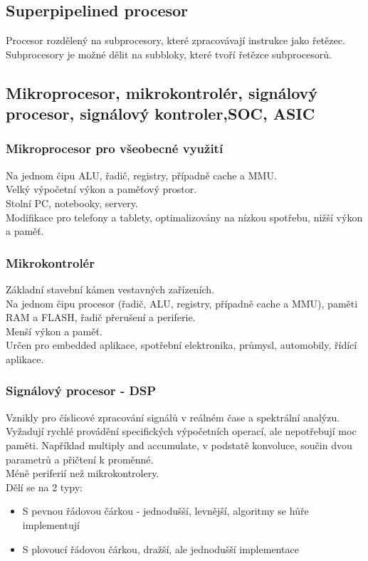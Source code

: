 \subsection{Superpipelined procesor}
Procesor rozdělený na subprocesory, které zpracovávají instrukce jako řetězec. \\
Subprocesory je možné dělit na subbloky, které tvoří řetězce subprocesorů. \\

\subsection{Mikroprocesor, mikrokontrolér, signálový procesor, signálový kontroler,SOC, ASIC}
\subsubsection{Mikroprocesor pro všeobecné využití}
Na jednom čipu ALU, řadič, registry, případně cache a MMU.\\
Velký výpočetní výkon a paměťový prostor.\\
Stolní PC, notebooky, servery.\\
Modifikace pro telefony a tablety, optimalizovány na nízkou spotřebu, nižší výkon a paměť. \\

\subsubsection*{Mikrokontrolér}
Základní stavební kámen vestavných zařízeních. \\
Na jednom čipu procesor (řadič, ALU, registry, případně cache a MMU), paměti RAM a FLASH, řadič přerušení a periferie.\\
Menší výkon a paměť.\\
Určen pro embedded aplikace, spotřební elektronika, průmysl, automobily, řídící aplikace. \\

\subsubsection*{Signálový procesor - DSP}
Vznikly pro číslicové zpracování signálů v reálném čase a spektrální analýzu. \\
Vyžadují rychlé provádění specifických výpočetních operací, ale nepotřebují moc paměti. Například multiply and accumulate, v podstatě konvoluce, součin dvou parametrů a přičtení k proměnné.\\
Méně periferií než mikrokontrolery. \\
Dělí se na 2 typy:
\begin{itemize}
    \item S pevnou řádovou čárkou - jednodušší, levnější, algoritmy se hůře implementují
    \item S plovoucí řádovou čárkou, dražší, ale jednodušší implementace
\end{itemize}

